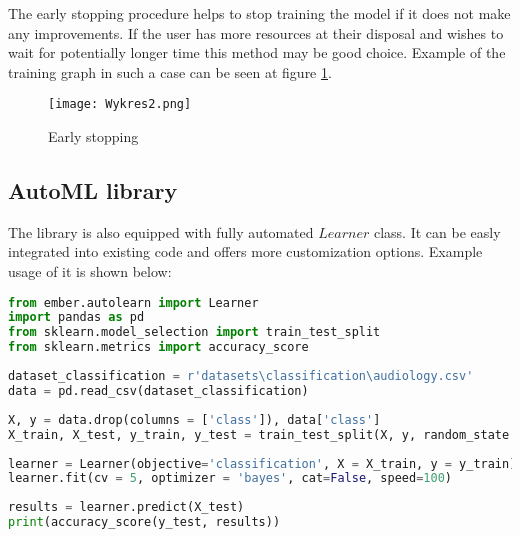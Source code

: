 \documentclass[a4paper,twoside,12pt]{book}
\begin{document}
The early stopping procedure helps to stop training the model if it does not make any improvements. If the user has more resources at their disposal and wishes to wait for potentially longer time this method may be good choice. Example of the training graph in such a case can be seen at figure \ref{fig:early}.

\begin{figure}[h]
    \centering
    \texttt{[image: Wykres2.png]}
    \caption{Early stopping}
    \label{fig:early}
\end{figure}

\subsection{AutoML library}

The library is also equipped with fully automated $Learner$ class. It can be easly integrated into existing code and offers more customization options. Example usage of it is shown below:

\begin{lstlisting}[language=Python,caption={Importing necessary libraries}]
from ember.autolearn import Learner
import pandas as pd
from sklearn.model_selection import train_test_split
from sklearn.metrics import accuracy_score
\end{lstlisting}

\begin{lstlisting}[language=Python,caption={Loading the dataset}]
dataset_classification = r'datasets\classification\audiology.csv'
data = pd.read_csv(dataset_classification)
\end{lstlisting}

\begin{lstlisting}[language=Python,caption={Dividing dataset to train and test subsets}]
X, y = data.drop(columns = ['class']), data['class']
X_train, X_test, y_train, y_test = train_test_split(X, y, random_state = 42, test_size = 20)
\end{lstlisting}

\begin{lstlisting}[language=Python,caption={Model training with classification objective}]
learner = Learner(objective='classification', X = X_train, y = y_train)
learner.fit(cv = 5, optimizer = 'bayes', cat=False, speed=100)
\end{lstlisting}

\begin{lstlisting}[language=Python,caption={Computing metrics}]
results = learner.predict(X_test)
print(accuracy_score(y_test, results))
\end{lstlisting}
\end{document}
